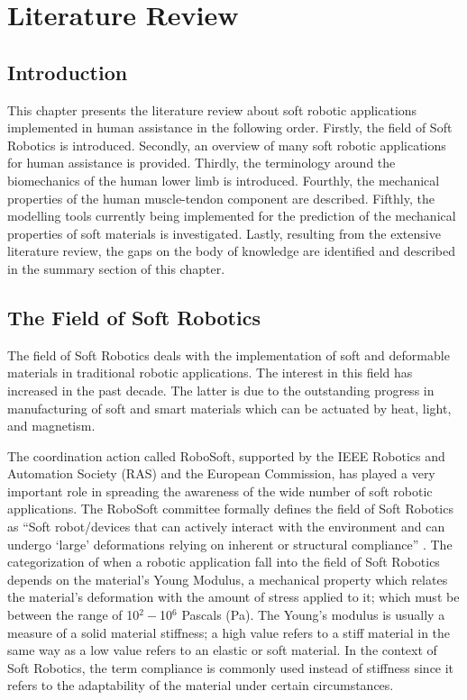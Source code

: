 \chapter{Literature Review} \label{ch2:Literature}

\section{Introduction}

This chapter presents the literature review about soft robotic applications implemented in human assistance in the following order. Firstly, the field of Soft Robotics is introduced. Secondly, an overview of many soft robotic applications for human assistance is provided. Thirdly, the terminology around the biomechanics of the human lower limb is introduced. Fourthly, the mechanical properties of the human muscle-tendon component are described. Fifthly, the modelling tools currently being implemented for the prediction of the mechanical properties of soft materials is investigated. Lastly, resulting from the extensive literature review, the gaps on the body of knowledge are identified and described in the summary section of this chapter.

\section{The Field of Soft Robotics}

The field of Soft Robotics deals with the implementation of soft and deformable materials in traditional robotic applications. The interest in this field has increased in the past decade. The latter is due to the outstanding progress in manufacturing of soft and smart materials which can be actuated by heat, light, and magnetism. 

The coordination action called RoboSoft, supported by the IEEE Robotics and Automation Society (RAS) and the European Commission, has played a very important role in spreading the awareness of the wide number of soft robotic applications. The RoboSoft committee formally defines the field of Soft Robotics as ``Soft robot/devices that can actively interact with the environment and can undergo `large' deformations relying on inherent or structural compliance'' \cite{laschi2016soft}. The categorization of when a robotic application fall into the field of Soft Robotics depends on the material's Young Modulus, a mechanical property which relates the material's deformation with the amount of stress applied to it; which must be between the range of 10$^{2} - $10$^{6}$ Pascals (Pa). The Young's modulus is usually a measure of a solid material stiffness; a high value refers to a stiff material in the same way as a low value refers to an elastic or soft material. In the context of Soft Robotics, the term compliance is commonly used instead of stiffness since it refers to the adaptability of the material under certain circumstances.

